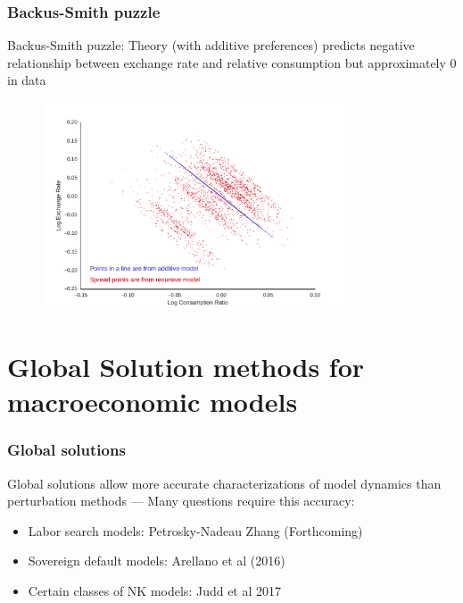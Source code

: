 \documentclass[10pt]{beamer}
\begin{document}
  \begin{frame} \frametitle{Backus-Smith puzzle}

    Backus-Smith puzzle: Theory (with additive preferences) predicts negative relationship between
    exchange rate and relative consumption but approximately 0 in data

    \begin{figure}[htb]
      \includegraphics[width=0.8\textwidth]{../ms/images/BCFL/con_v_fxr_alpha9.pdf}
    \end{figure}

  \end{frame}

\section{Global Solution methods for macroeconomic models}

  \begin{frame} \frametitle{Global solutions}

    Global solutions allow more accurate characterizations of model dynamics than perturbation
    methods --- Many questions require this accuracy:

    \vspace{0.25cm}

    \begin{itemize}
      \item Labor search models: Petrosky-Nadeau Zhang (Forthcoming)
      \item Sovereign default models: Arellano et al (2016)
      \item Certain classes of NK models: Judd et al 2017
    \end{itemize}

  \end{frame}
\end{document}
